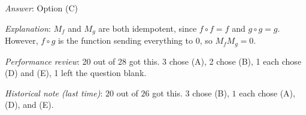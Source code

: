\documentclass[10pt]{amsart}
\begin{document}
\begin{enumerate}
  {\em Answer}: Option (C)

  {\em Explanation}: $M_f$ and $M_g$ are both idempotent, since $f
  \circ f = f$ and $g \circ g = g$. However, $f \circ g$ is the
  function sending everything to $0$, so $M_fM_g = 0$.

  {\em Performance review}: 20 out of 28 got this. 3 chose (A), 2
  chose (B), 1 each chose (D) and (E), 1 left the question blank.

  {\em Historical note (last time)}: $20$ out of $26$ got this. $3$
  chose (B), $1$ each chose (A), (D), and (E).

\end{enumerate}
\end{document}
